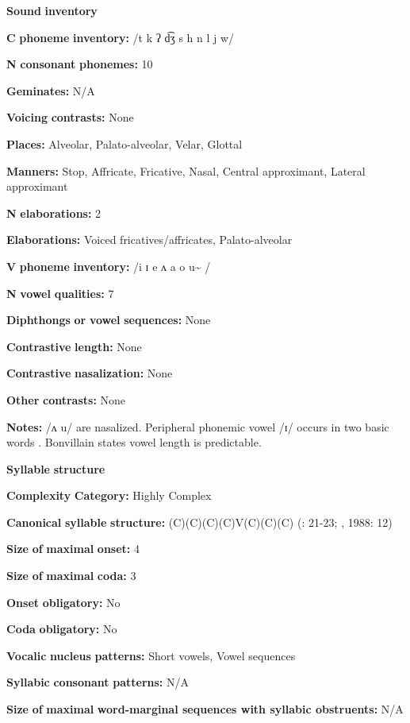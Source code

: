 \textbf{Sound} \textbf{inventory}

\textbf{C} \textbf{phoneme} \textbf{inventory:} /t k ʔ d͡ʒ s h n l j w/

\textbf{N} \textbf{consonant} \textbf{phonemes:} 10

\textbf{Geminates:} N/A

\textbf{Voicing} \textbf{contrasts:} None

\textbf{Places:} Alveolar, Palato-alveolar, Velar, Glottal

\textbf{Manners:} Stop, Affricate, Fricative, Nasal, Central approximant, Lateral approximant

\textbf{N} \textbf{elaborations:} 2

\textbf{Elaborations:} Voiced fricatives/affricates, Palato-alveolar

\textbf{V} \textbf{phoneme} \textbf{inventory:} /i ɪ e ʌ a o u\~{} /

\textbf{N} \textbf{vowel} \textbf{qualities:} 7

\textbf{Diphthongs} \textbf{or} \textbf{vowel} \textbf{sequences:} None

\textbf{Contrastive} \textbf{length:} None

\textbf{Contrastive} \textbf{nasalization:} None

\textbf{Other} \textbf{contrasts:} None

\textbf{Notes:} /ʌ u/ are nasalized. Peripheral phonemic vowel /ɪ/ occurs in two basic words \citep[43]{Bonvillain1973}. Bonvillain states vowel length is predictable.

\textbf{Syllable} \textbf{structure}

\textbf{Complexity} \textbf{Category:} Highly Complex

\textbf{Canonical} \textbf{syllable} \textbf{structure:} (C)(C)(C)(C)V(C)(C)(C) (\citealt{Bonvillain1973}: 21-23; \citealt{Michelson1981}, 1988: 12)

\textbf{Size} \textbf{of} \textbf{maximal} \textbf{onset:} 4

\textbf{Size} \textbf{of} \textbf{maximal} \textbf{coda:} 3

\textbf{Onset} \textbf{obligatory:} No

\textbf{Coda} \textbf{obligatory:} No

\textbf{Vocalic} \textbf{nucleus} \textbf{patterns:} Short vowels, Vowel sequences

\textbf{Syllabic} \textbf{consonant} \textbf{patterns:} N/A

\textbf{Size} \textbf{of} \textbf{maximal} \textbf{word{}-marginal sequences with syllabic obstruents:} N/A

